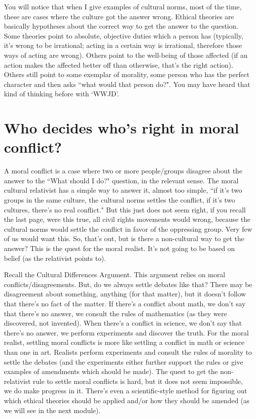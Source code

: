 You will notice that when I give examples of cultural norms, most of the time, these are cases where the culture got the answer wrong. Ethical theories are basically hypotheses about the correct way to get the answer to the question. Some theories point to absolute, objective duties which a person has (typically, it's wrong to be irrational; acting in a certain way is irrational, therefore those ways of acting are wrong). Others point to the well-being of those affected (if an action makes the affected better off than otherwise, that's the right action). Others still point to some exemplar of morality, some person who has the perfect character and then asks ``what would that person do?". You may have heard that kind of thinking before with `WWJD'.  
\section{Who decides who's right in moral conflict?}

A moral conflict is a case where two or more people/groups disagree about the answer to the ``What should I do?" question, in the relevant sense. The moral cultural relativist has a simple way to answer it, almost too simple, ``if it's two groups in the same culture, the cultural norms settles the conflict, if it's two cultures, there's no real conflict." But this just does not seem right, if you recall the last page, were this true, all civil rights movements would wrong, because the cultural norms would settle the conflict in favor of the oppressing group. Very few of us would want this. So, that's out, but is there a non-cultural way to get the answer? This is the quest for the moral realist. It's not going to be based on belief (as the relativist points to).

Recall the Cultural Differences Argument. This argument relies on moral conflicts/disagreements. But, do we always settle debates like that? There may be disagreement about something, anything (for that matter), but it doesn't follow that there's no fact of the matter. If there's a conflict about math, we don't say that there's no answer, we consult the rules of mathematics (as they were discovered, not invented). When there's a conflict in science, we don't say that there's no answer, we perform experiments and discover the truth. For the moral realist, settling moral conflicts is more like settling a conflict in math or science than one in art. Realists perform experiments and consult the rules of morality to settle the debates (and the experiments either further support the rules or give examples of amendments which should be made). The quest to get the non-relativist rule to settle moral conflicts is hard, but it does not seem impossible, we do make progress in it. There's even a scientific-style method for figuring out which ethical theories should be applied and/or how they should be amended (as we will see in the next module).

